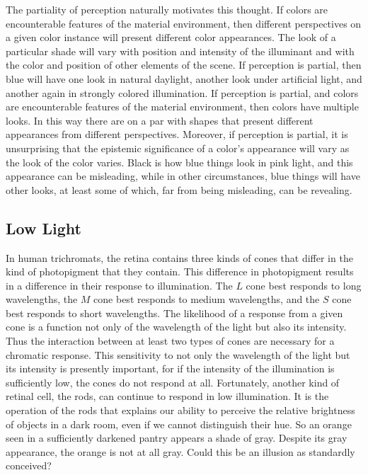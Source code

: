 \documentclass[12pt]{article}
\begin{document}
The partiality of perception naturally motivates this thought. If colors are encounterable features of the material environment, then different perspectives on a given color instance will present different color appearances. The look of a particular shade will vary with position and intensity of the illuminant and with the color and position of other elements of the scene. If perception is partial, then blue will have one look in natural daylight, another look under artificial light, and another again in strongly colored illumination. If perception is partial, and colors are encounterable features of the material environment, then colors have multiple looks. In this way there are on a par with shapes that present different appearances from different perspectives. Moreover, if perception is partial, it is unsurprising that the epistemic significance of a color's appearance will vary as the look of the color varies. Black is how blue things look in pink light, and this appearance can be misleading, while in other circumstances, blue things will have other looks, at least some of which, far from being misleading, can be revealing.


\subsection{Low Light}\label{sub:low_light} %

In human trichromats, the retina contains three kinds of cones that differ in the kind of photopigment that they contain. This difference in photopigment results in a difference in their response to illumination. The \( L \) cone best responds to long wavelengths, the \( M \) cone best responds to medium wavelengths, and the \( S \) cone best responds to short wavelengths. The likelihood of a response from a given cone is a function not only of the wavelength of the light but also its intensity. Thus the interaction between at least two types of cones are necessary for a chromatic response. This sensitivity to not only the wavelength of the light but its intensity is presently important, for if the intensity of the illumination is sufficiently low, the cones do not respond at all. Fortunately, another kind of retinal cell, the rods, can continue to respond in low illumination. It is the operation of the rods that explains our ability to perceive the relative brightness of objects in a dark room, even if we cannot distinguish their hue. So an orange seen in a sufficiently darkened pantry appears a shade of gray. Despite its gray appearance, the orange is not at all gray. Could this be an illusion as standardly conceived?
\end{document}
